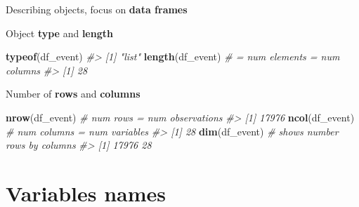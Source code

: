\documentclass[8pt,ignorenonframetext,]{beamer}
\newenvironment{Shaded}{\begin{snugshade}}{\end{snugshade}}
\newcommand{\KeywordTok}[1]{\textcolor[rgb]{0.13,0.29,0.53}{\textbf{#1}}}
\newcommand{\CommentTok}[1]{\textcolor[rgb]{0.56,0.35,0.01}{\textit{#1}}}
\newcommand{\NormalTok}[1]{#1}
\begin{document}
\begin{frame}[fragile]{Describing objects, focus on \textbf{data
frames}}

Object \textbf{type} and \textbf{length}

\begin{Shaded}
\begin{Highlighting}[]
\KeywordTok{typeof}\NormalTok{(df_event)}
\CommentTok{#> [1] "list"}
\KeywordTok{length}\NormalTok{(df_event) }\CommentTok{# = num elements = num columns}
\CommentTok{#> [1] 28}
\end{Highlighting}
\end{Shaded}

Number of \textbf{rows} and \textbf{columns}

\begin{Shaded}
\begin{Highlighting}[]
\KeywordTok{nrow}\NormalTok{(df_event) }\CommentTok{# num rows = num observations}
\CommentTok{#> [1] 17976}
\KeywordTok{ncol}\NormalTok{(df_event) }\CommentTok{# num columns = num variables}
\CommentTok{#> [1] 28}
\KeywordTok{dim}\NormalTok{(df_event) }\CommentTok{# shows number rows by columns}
\CommentTok{#> [1] 17976    28}
\end{Highlighting}
\end{Shaded}

\end{frame}

\section{Variables names}\label{variables-names}
\end{document}
